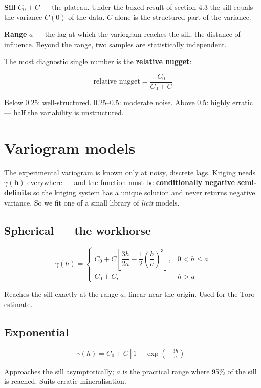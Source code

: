 \documentclass[11pt]{article}
\begin{document}
\textbf{Sill} $C_0+C$ --- the plateau. Under the boxed result of section
4.3 the sill equals the variance $C(0)$ of the data. $C$ alone is the
structured part of the variance.

\textbf{Range} $a$ --- the lag at which the variogram reaches the sill;
the distance of influence. Beyond the range, two samples are
statistically independent.

The most diagnostic single number is the \textbf{relative nugget}:

\begin{eqbox}
\[ \text{relative nugget} = \frac{C_0}{C_0+C} \tag{4.6}\]
\end{eqbox}

Below 0.25: well-structured. 0.25--0.5: moderate noise. Above 0.5: highly
erratic --- half the variability is unstructured.

\section{Variogram models}

The experimental variogram is known only at noisy, discrete lags. Kriging
needs $\gamma(\mathbf{h})$ everywhere --- and the function must be
\textbf{conditionally negative semi-definite} so the kriging system has a
unique solution and never returns negative variance. So we fit one of a
small library of \emph{licit} models.

\subsection*{Spherical --- the workhorse}
\begin{eqbox}
\[ \gamma(h)=\begin{cases}
   C_0+C\!\left[\dfrac{3h}{2a}-\dfrac{1}{2}\!\left(\dfrac{h}{a}\right)^{\!3}
   \right], & 0<h\le a\\[2mm]
   C_0+C, & h>a \end{cases} \tag{4.7}\]
\end{eqbox}
Reaches the sill exactly at the range $a$, linear near the origin. Used
for the Toro estimate.

\subsection*{Exponential}
\begin{eqbox}
\[ \gamma(h)=C_0+C\left[1-\exp\!\left(-\tfrac{3h}{a}\right)\right]
   \tag{4.8}\]
\end{eqbox}
Approaches the sill asymptotically; $a$ is the practical range where 95\%
of the sill is reached. Suits erratic mineralisation.
\end{document}
